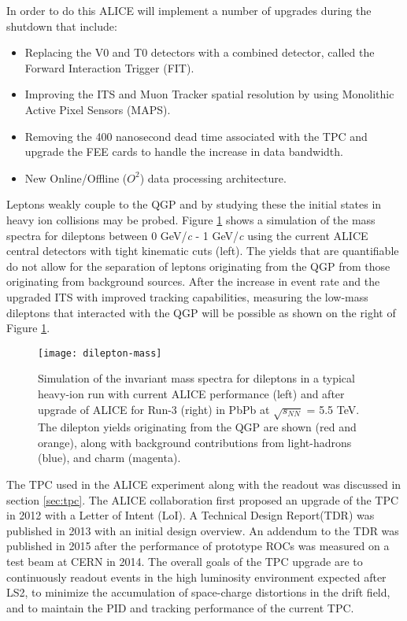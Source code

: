\noindent
In order to do this ALICE will implement a number of upgrades \cite{1742-6596-589-1-012014} during the shutdown that include:

\begin{itemize}
\item Replacing the V0 and T0 detectors with a combined detector, called the Forward Interaction Trigger (FIT)\cite{1742-6596-798-1-012186}.
\item Improving the ITS and Muon Tracker spatial resolution by using  Monolithic Active Pixel Sensors (MAPS)\cite{Abelev:1625842}\cite{CERN-LHCC-2015-001}.
\item Removing the 400 nanosecond dead time associated with the TPC and upgrade the FEE cards to handle the increase in data bandwidth\cite{Abelev:1475243}.
\item New Online/Offline ($O^{2}$) data processing architecture\cite{Buncic:2011297}.
\end{itemize}

\noindent
Leptons weakly couple to the QGP\cite{Ryblewski:2015sha} and by studying these the initial states in heavy ion collisions may be probed\cite{Mauricio:2007vz}.  Figure  \ref{fig:lowmassdilep} shows a simulation of the mass spectra for dileptons between 0 GeV/\textit{c} - 1 GeV/\textit{c} using the current ALICE central detectors with tight kinematic cuts (left).  The yields that are quantifiable do not allow for the separation of leptons originating from the QGP from those originating from background sources.  After the increase in event rate and the upgraded ITS with improved tracking capabilities, measuring the low-mass dileptons that interacted with the QGP will be possible as shown on the right of Figure \ref{fig:lowmassdilep}. 

\begin{figure}[h]
\texttt{[image: dilepton-mass]}
\centering
\caption{Simulation of the invariant  mass spectra for dileptons in a typical heavy-ion run with current ALICE performance (left) and after upgrade of ALICE for Run-3 (right) in PbPb at $\sqrt{s_{NN}}$ = 5.5 TeV.  The dilepton yields originating from the QGP are shown (red and orange), along with background contributions from light-hadrons (blue), and charm (magenta)\cite{Abelev:1475243}.}
\label{fig:lowmassdilep}
\end{figure}

\noindent
The TPC used in the ALICE experiment along with the readout was discussed in section \ref{sec:tpc}.  The ALICE collaboration first proposed an upgrade of the TPC in 2012 with a Letter of Intent (LoI)\cite{Abelev:1475243}.  A Technical Design Report(TDR)\cite{CERN-LHCC-2013-020} was published in 2013 with an initial design overview.  An addendum to the TDR\cite{CERN-LHCC-2015-002} was published in 2015 after the performance of prototype ROCs was measured on a test beam at CERN in 2014.  The overall goals of the TPC upgrade are to continuously readout events in the high luminosity environment expected after LS2, to minimize the accumulation of space-charge distortions in the drift field, and to maintain the PID and tracking performance of the current TPC.


